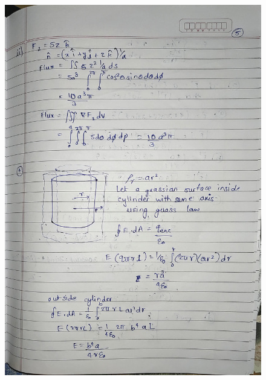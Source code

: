 \documentclass{article}
\begin{document}
\begin{figure}[H]
    \centering
    \includegraphics[width=\textwidth]{figs/written/5.jpg}
\end{figure}
\end{document}
